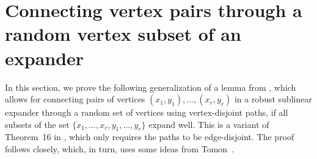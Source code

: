\documentclass[10pt]{article}
\theoremstyle{plain}
\numberwithin{theorem}{section}
\theoremstyle{definition}
\theoremstyle{remark}
\renewcommand{\setminus}{-}
\newcommand{\eps}{\varepsilon}
\theoremstyle{plain}
\begin{document}

\section{Connecting vertex pairs through a random vertex subset of an expander}
\label{sec:connectingthroughrandom}

In this section, we prove the following generalization of a lemma from \cite{letzter2024separating}, which allows for connecting pairs of vertices $(x_1, y_1), \ldots, (x_r, y_r)$ in a robust sublinear expander through a random set of vertices using vertex-disjoint paths, if all subsets of the set $\{x_1, \ldots, x_r, y_1, \ldots, y_r\}$ expand well. This is a variant of Theorem~16 in \cite{bucic2022erdos}, which only requires the paths to be edge-disjoint. The proof follows \cite{bucic2022erdos} closely, which, in turn, uses some ideas from Tomon~\cite{tomon2024robust}. 
\end{document}
